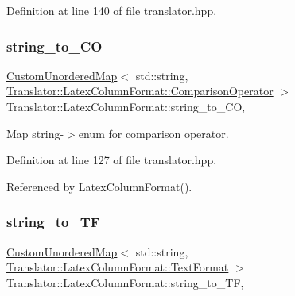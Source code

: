 Definition at line 140 of file translator.\+hpp.

\mbox{\label{classTranslator_1_1LatexColumnFormat_aba6d9359f0bb5746328261880506df22}} 
\subsubsection{\texorpdfstring{string\+\_\+to\+\_\+\+CO}{string\_to\_CO}}
{\footnotesize\ttfamily \hyperlink{custom__map_8hpp_ad1ed68f2ff093683ab1a33522b144adc}{Custom\+Unordered\+Map}$<$ std\+::string, \hyperlink{classTranslator_1_1LatexColumnFormat_a9401c4c02f92f224268e919aac9cb15e}{Translator\+::\+Latex\+Column\+Format\+::\+Comparison\+Operator} $>$ Translator\+::\+Latex\+Column\+Format\+::string\+\_\+to\+\_\+\+CO\hspace{0.3cm}{\ttfamily [static]}, {\ttfamily [private]}}



Map string-\/$>$enum for comparison operator. 



Definition at line 127 of file translator.\+hpp.



Referenced by Latex\+Column\+Format().

\mbox{\label{classTranslator_1_1LatexColumnFormat_a36ea39931ecac504ff4df615c2aa4608}} 
\subsubsection{\texorpdfstring{string\+\_\+to\+\_\+\+TF}{string\_to\_TF}}
{\footnotesize\ttfamily \hyperlink{custom__map_8hpp_ad1ed68f2ff093683ab1a33522b144adc}{Custom\+Unordered\+Map}$<$ std\+::string, \hyperlink{classTranslator_1_1LatexColumnFormat_a3e57341308ef433ca03cb41faa3e6c00}{Translator\+::\+Latex\+Column\+Format\+::\+Text\+Format} $>$ Translator\+::\+Latex\+Column\+Format\+::string\+\_\+to\+\_\+\+TF\hspace{0.3cm}{\ttfamily [static]}, {\ttfamily [private]}}



